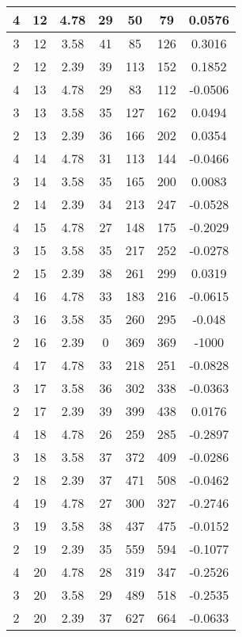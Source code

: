 \documentclass[letterpaper, 12pt]{article}
\begin{document}
\begin{longtable}{|c|c|c|c|c|c|c|}
\hline
4 & 12 & 4.78 & 29 & 50 & 79 & 0.0576 \\
\hline
3 & 12 & 3.58 & 41 & 85 & 126 & 0.3016 \\
\hline
2 & 12 & 2.39 & 39 & 113 & 152 & 0.1852 \\
\hline
4 & 13 & 4.78 & 29 & 83 & 112 & -0.0506 \\
\hline
3 & 13 & 3.58 & 35 & 127 & 162 & 0.0494 \\
\hline
2 & 13 & 2.39 & 36 & 166 & 202 & 0.0354 \\
\hline
4 & 14 & 4.78 & 31 & 113 & 144 & -0.0466 \\
\hline
3 & 14 & 3.58 & 35 & 165 & 200 & 0.0083 \\
\hline
2 & 14 & 2.39 & 34 & 213 & 247 & -0.0528 \\
\hline
4 & 15 & 4.78 & 27 & 148 & 175 & -0.2029 \\
\hline
3 & 15 & 3.58 & 35 & 217 & 252 & -0.0278 \\
\hline
2 & 15 & 2.39 & 38 & 261 & 299 & 0.0319 \\
\hline
4 & 16 & 4.78 & 33 & 183 & 216 & -0.0615 \\
\hline
3 & 16 & 3.58 & 35 & 260 & 295 & -0.048 \\
\hline
2 & 16 & 2.39 & 0 & 369 & 369 & -1000 \\
\hline
4 & 17 & 4.78 & 33 & 218 & 251 & -0.0828 \\
\hline
3 & 17 & 3.58 & 36 & 302 & 338 & -0.0363 \\
\hline
2 & 17 & 2.39 & 39 & 399 & 438 & 0.0176 \\
\hline
4 & 18 & 4.78 & 26 & 259 & 285 & -0.2897 \\
\hline
3 & 18 & 3.58 & 37 & 372 & 409 & -0.0286 \\
\hline
2 & 18 & 2.39 & 37 & 471 & 508 & -0.0462 \\
\hline
4 & 19 & 4.78 & 27 & 300 & 327 & -0.2746 \\
\hline
3 & 19 & 3.58 & 38 & 437 & 475 & -0.0152 \\
\hline
2 & 19 & 2.39 & 35 & 559 & 594 & -0.1077 \\
\hline
4 & 20 & 4.78 & 28 & 319 & 347 & -0.2526 \\
\hline
3 & 20 & 3.58 & 29 & 489 & 518 & -0.2535 \\
\hline
2 & 20 & 2.39 & 37 & 627 & 664 & -0.0633 \\
\hline
\end{longtable}
\end{document}
